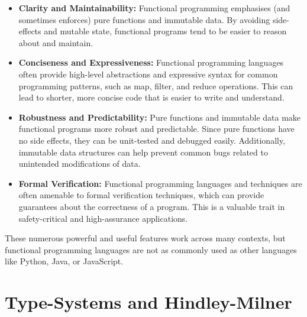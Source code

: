 \documentclass{l4proj}
\begin{document}
\begin{itemize}
    \item \textbf{Clarity and Maintainability:} Functional programming emphasises (and sometimes enforces) pure functions and immutable data.
    By avoiding side-effects and mutable state, functional programs tend to be easier to reason about and maintain.
    \item \textbf{Conciseness and Expressiveness:} Functional programming languages often provide high-level abstractions and expressive syntax for common programming patterns, such as map, filter, and reduce operations.
    This can lead to shorter, more concise code that is easier to write and understand.
    \item \textbf{Robustness and Predictability:} Pure functions and immutable data make functional programs more robust and predictable.
    Since pure functions have no side effects, they can be unit-tested and debugged easily.
    Additionally, immutable data structures can help prevent common bugs related to unintended modifications of data.
    \item \textbf{Formal Verification:} Functional programming languages and techniques are often amenable to formal verification techniques, which can provide guarantees about the correctness of a program.
    This is a valuable trait in safety-critical and high-assurance applications.
\end{itemize}

These numerous powerful and useful features work across many contexts, but functional programming languages are not as commonly used as other languages like Python, Java, or JavaScript. 

\section{Type-Systems and Hindley-Milner}

\end{document}

